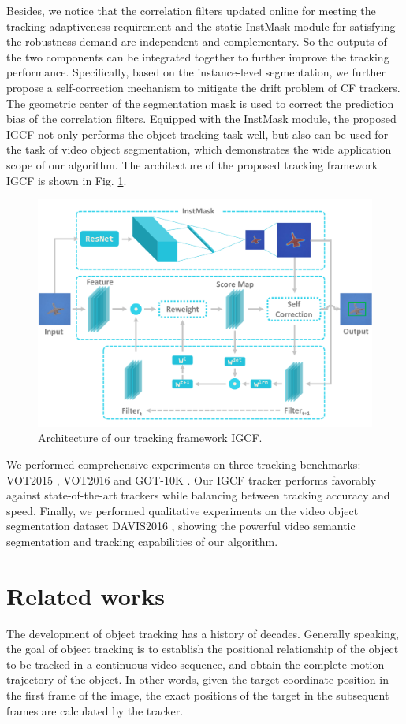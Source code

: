 \documentclass[review]{elsarticle}
\begin{document}
\begin{CJK*}{UTF8}{gbsn}
Besides, we notice that the correlation filters updated online for meeting the tracking adaptiveness requirement and the static InstMask module for satisfying the robustness demand are independent and complementary. So the outputs of the two components can be integrated together to further improve the tracking performance. Specifically, based on the instance-level segmentation, we further propose a self-correction mechanism to mitigate the drift problem of CF trackers. The geometric center of the segmentation mask is used to correct the prediction bias of the correlation filters. Equipped with the InstMask module, the proposed IGCF not only performs the object tracking task well, but also can be used for the task of video object segmentation, which demonstrates the wide application scope of our algorithm. The architecture of the proposed tracking framework IGCF is shown in Fig. \ref{fig:IGCF}.

\begin{figure}
    \centering
    \includegraphics[width=12cm]{images/instmask1.pdf}
    \caption{Architecture of our tracking framework IGCF.}
    \label{fig:IGCF}
\end{figure}

We performed comprehensive experiments on three tracking benchmarks: VOT2015 \cite{Kristan2015TheVO}, VOT2016 \cite{Kristan2016TheVO} and GOT-10K \cite{Huang2018GOT10kAL}. Our IGCF tracker performs favorably against state-of-the-art trackers while balancing between tracking accuracy and speed. Finally, we performed qualitative experiments on the video object segmentation dataset DAVIS2016 \cite{Perazzi2016}, showing the powerful video semantic segmentation and tracking capabilities of our algorithm.

\section{Related works}
The development of object tracking has a history of decades. Generally speaking, the goal of object tracking is to establish the positional relationship of the object to be tracked in a continuous video sequence, and obtain the complete motion trajectory of the object. In other words, given the target coordinate position in the first frame of the image, the exact positions of the target in the subsequent frames are calculated by the tracker. 


\end{CJK*}
\end{document}
